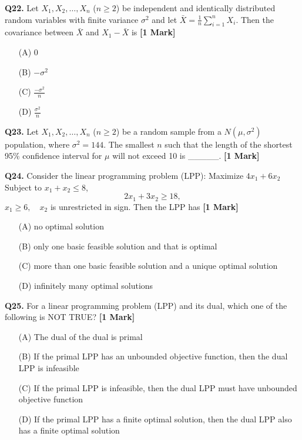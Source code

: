 \documentclass[11pt]{article}
\newcommand{\questiona}[2]{
    \noindent\textbf{Q#2.} #1 \hfill \textbf{[1 Mark]}
}
\begin{document}
\questiona{Let \( X_1, X_2, \ldots, X_n \) (\( n \geq 2 \)) be independent and identically distributed random variables with finite variance \( \sigma^2 \) and let \( \bar{X} = \frac{1}{n} \sum_{i=1}^n X_i \). Then the covariance between \( \bar{X} \) and \( X_1 - \bar{X} \) is}{22}
\begin{enumerate}
    \item[(A)] 0  
    \item[(B)] \( -\sigma^2 \)  
    \item[(C)] \( \frac{-\sigma^2}{n} \)  
    \item[(D)] \( \frac{\sigma^2}{n} \)  
\end{enumerate}
\vspace{0.5cm}

\questiona{Let \( X_1, X_2, \ldots, X_n \) (\( n \geq 2 \)) be a random sample from a \( N(\mu, \sigma^2) \) population, where \( \sigma^2 = 144 \). The smallest \( n \) such that the length of the shortest 95\% confidence interval for \( \mu \) will not exceed 10 is \_\_\_\_\_.}{23}
\vspace{0.5cm}

\questiona{Consider the linear programming problem (LPP): Maximize \(4x_1 + 6x_2\) Subject to \(x_1 + x_2 \leq 8\), \[2x_1 + 3x_2 \geq 18,\] \(x_1 \geq 6, \quad x_2\) is unrestricted in sign. Then the LPP has}{24}
\begin{enumerate}
    \item[(A)] no optimal solution  
    \item[(B)] only one basic feasible solution and that is optimal  
    \item[(C)] more than one basic feasible solution and a unique optimal solution  
    \item[(D)] infinitely many optimal solutions  
\end{enumerate}
\vspace{0.5cm}

\questiona{For a linear programming problem (LPP) and its dual, which one of the following is NOT TRUE?}{25}
\begin{enumerate}
    \item[(A)] The dual of the dual is primal  
    \item[(B)] If the primal LPP has an unbounded objective function, then the dual LPP is infeasible  
    \item[(C)] If the primal LPP is infeasible, then the dual LPP must have unbounded objective function  
    \item[(D)] If the primal LPP has a finite optimal solution, then the dual LPP also has a finite optimal solution  
\end{enumerate}
\vspace{0.5cm}
\end{document}

